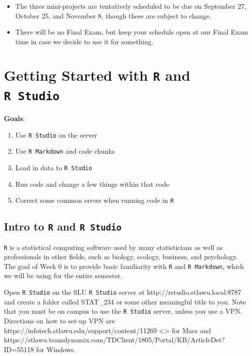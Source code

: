 \documentclass[
]{book}
\providecommand{\tightlist}{%
  \setlength{\itemsep}{0pt}\setlength{\parskip}{0pt}}
\begin{document}
\begin{itemize}
\tightlist
\item
  The three mini-projects are tentatively scheduled to be due on September 27, October 25, and November 8, though these are subject to change.
\item
  There will be no Final Exam, but keep your schedule open at our Final Exam time in case we decide to use it for something.
\end{itemize}

\hypertarget{intro}{%
\chapter{\texorpdfstring{Getting Started with \texttt{R} and \texttt{R\ Studio}}{Getting Started with R and R Studio}}\label{intro}}

\textbf{Goals}:

\begin{enumerate}
\def\labelenumi{\arabic{enumi}.}
\item
  Use \texttt{R\ Studio} on the server
\item
  Use \texttt{R\ Markdown} and code chunks
\item
  Load in data to \texttt{R\ Studio}
\item
  Run code and change a few things within that code
\item
  Correct some common errors when running code in \texttt{R}
\end{enumerate}

\hypertarget{intro-to-r-and-r-studio}{%
\section{\texorpdfstring{Intro to \texttt{R} and \texttt{R\ Studio}}{Intro to R and R Studio}}\label{intro-to-r-and-r-studio}}

\texttt{R} is a statistical computing software used by many statisticians as well as professionals in other fields, such as biology, ecology, business, and psychology. The goal of Week 0 is to provide basic familiarity with \texttt{R} and \texttt{R\ Markdown}, which we will be using for the entire semester.

Open \texttt{R\ Studio} on the SLU \texttt{R\ Studio} server at
http://rstudio.stlawu.local:8787 and create a folder called STAT\_234 or some other meaningful title to you. Note that you must be on campus to use the \texttt{R\ Studio} server, unless you use a VPN. Directions on how to set-up VPN are
https://infotech.stlawu.edu/support/content/11269
\textless\textgreater{} for Macs and https://stlawu.teamdynamix.com/TDClient/1805/Portal/KB/ArticleDet?ID=55118 for Windows.
\end{document}
